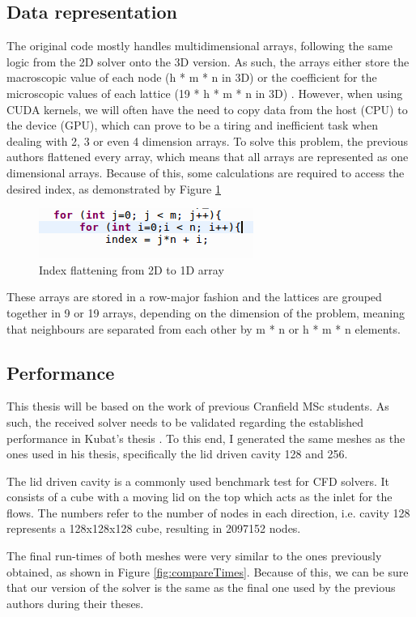 \documentclass[12pt, openany]{book}
\begin{document}
\subsection{Data representation}
The original code mostly handles multidimensional arrays, following the same logic from the 2D solver onto the 3D version. As such, the arrays either store the macroscopic value of each node (h * m * n in 3D) or the coefficient for the microscopic values of each lattice (19 * h * m * n in 3D) . However, when using CUDA kernels, we will often have the need to copy data from the host (CPU) to the device (GPU), which can prove to be a tiring and inefficient task when dealing with 2, 3 or even 4 dimension arrays. To solve this problem, the previous authors flattened every array, which means that all arrays are represented as one dimensional arrays. Because of this, some calculations are required to access the desired index, as demonstrated by Figure \ref{fig:flat}

\begin{figure}[H]
	\centering
	\includegraphics[width=0.6\linewidth]{Resources/Images/flat2d.png}
	\caption{Index flattening from 2D to 1D array}
	\label{fig:flat}
\end{figure}

\par These arrays are stored in a row-major fashion and the lattices are grouped together in 9 or 19 arrays, depending on the dimension of the problem, meaning that neighbours are separated from each other by m * n or h * m * n elements.

\subsection{Performance}
This thesis will be based on the work of previous Cranfield MSc students. As such, the received solver needs to be validated regarding the established performance in Kubat’s thesis \cite{maciej_thesis}. To this end, I generated the same meshes as the ones used in his thesis, specifically the lid driven cavity 128 and 256. \par
The lid driven cavity is a commonly used benchmark test for CFD solvers. It consists of a cube with a moving lid on the top which acts as the inlet for the flows. The numbers refer to the number of nodes in each direction, i.e. cavity 128 represents a 128x128x128 cube, resulting in 2097152 nodes.
\par
The final run-times of both meshes were very similar to the ones previously obtained, as shown in Figure \ref{fig:compareTimes}. Because of this, we can be sure that our version of the solver is the same as the final one used by the previous authors during their theses. \par
\end{document}
